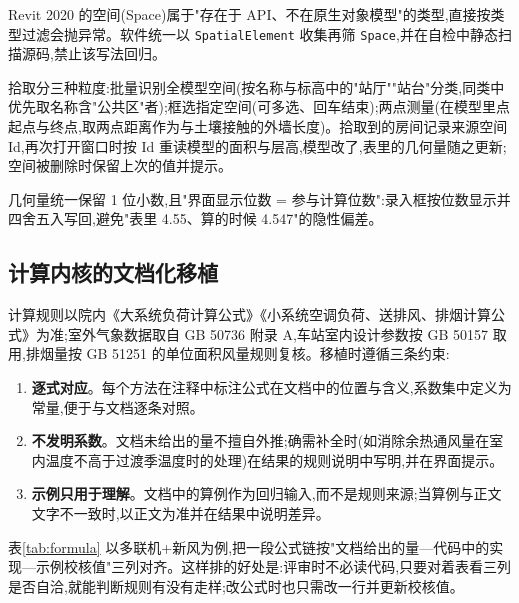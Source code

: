 \documentclass[UTF8,a4paper,zihao=-4]{ctexart}
\begin{document}
Revit 2020 的空间(Space)属于"存在于 API、不在原生对象模型"的类型,直接按类型过滤会抛异常。软件统一以 \texttt{SpatialElement} 收集再筛 \texttt{Space},并在自检中静态扫描源码,禁止该写法回归\cite{revitapi2020}。

拾取分三种粒度:批量识别全模型空间(按名称与标高中的"站厅""站台"分类,同类中优先取名称含"公共区"者);框选指定空间(可多选、回车结束);两点测量(在模型里点起点与终点,取两点距离作为与土壤接触的外墙长度)。拾取到的房间记录来源空间 Id,再次打开窗口时按 Id 重读模型的面积与层高,模型改了,表里的几何量随之更新;空间被删除时保留上次的值并提示。

几何量统一保留 1 位小数,且"界面显示位数 = 参与计算位数":录入框按位数显示并四舍五入写回,避免"表里 4.55、算的时候 4.547"的隐性偏差。

\subsection{计算内核的文档化移植}

计算规则以院内《大系统负荷计算公式》《小系统空调负荷、送排风、排烟计算公式》为准;室外气象数据取自 GB 50736 附录 A\cite{gb50736},车站室内设计参数按 GB 50157 取用\cite{gb50157},排烟量按 GB 51251 的单位面积风量规则复核\cite{gb51251}。移植时遵循三条约束:

\begin{enumerate}
\item \textbf{逐式对应}。每个方法在注释中标注公式在文档中的位置与含义,系数集中定义为常量,便于与文档逐条对照。
\item \textbf{不发明系数}。文档未给出的量不擅自外推;确需补全时(如消除余热通风量在室内温度不高于过渡季温度时的处理)在结果的规则说明中写明,并在界面提示。
\item \textbf{示例只用于理解}。文档中的算例作为回归输入,而不是规则来源;当算例与正文文字不一致时,以正文为准并在结果中说明差异。
\end{enumerate}

表\ref{tab:formula} 以多联机+新风为例,把一段公式链按"文档给出的量—代码中的实现—示例校核值"三列对齐。这样排的好处是:评审时不必读代码,只要对着表看三列是否自洽,就能判断规则有没有走样;改公式时也只需改一行并更新校核值。
\end{document}
